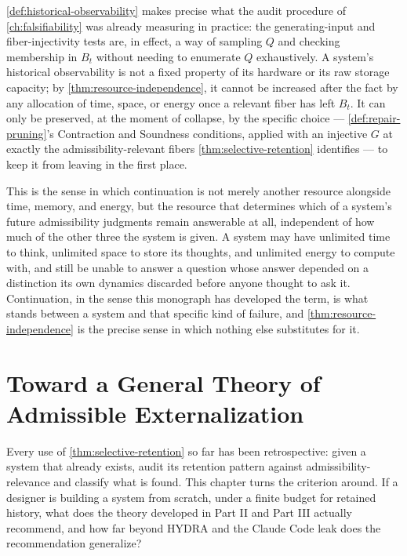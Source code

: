\documentclass[11pt]{book}
\theoremstyle{plain}
\theoremstyle{definition}
\theoremstyle{remark}
\begin{document}
\cref{def:historical-observability} makes precise what the audit
procedure of \cref{ch:falsifiability} was already measuring in
practice: the generating-input and fiber-injectivity tests are, in
effect, a way of sampling $Q$ and checking membership in $B_t$ without
needing to enumerate $Q$ exhaustively. A system's historical
observability is not a fixed property of its hardware or its raw
storage capacity; by \cref{thm:resource-independence}, it cannot be
increased after the fact by any allocation of time, space, or energy
once a relevant fiber has left $B_t$. It can only be preserved, at the
moment of collapse, by the specific choice --- \cref{def:repair-pruning}'s
Contraction and Soundness conditions, applied with an injective $G$
at exactly the admissibility-relevant fibers \cref{thm:selective-retention}
identifies --- to keep it from leaving in the first place.

This is the sense in which continuation is not merely another resource
alongside time, memory, and energy, but the resource that determines
which of a system's future admissibility judgments remain answerable
at all, independent of how much of the other three the system is
given. A system may have unlimited time to think, unlimited space to
store its thoughts, and unlimited energy to compute with, and still be
unable to answer a question whose answer depended on a distinction
its own dynamics discarded before anyone thought to ask it. Continuation,
in the sense this monograph has developed the term, is what stands
between a system and that specific kind of failure, and
\cref{thm:resource-independence} is the precise sense in which nothing
else substitutes for it.
\chapter{Toward a General Theory of Admissible Externalization}
\label{ch:general-theory}

Every use of \cref{thm:selective-retention} so far has been
retrospective: given a system that already exists, audit its retention
pattern against admissibility-relevance and classify what is found.
This chapter turns the criterion around. If a designer is building a
system from scratch, under a finite budget for retained history, what
does the theory developed in Part II and Part III actually recommend,
and how far beyond HYDRA and the Claude Code leak does the
recommendation generalize?
\end{document}

